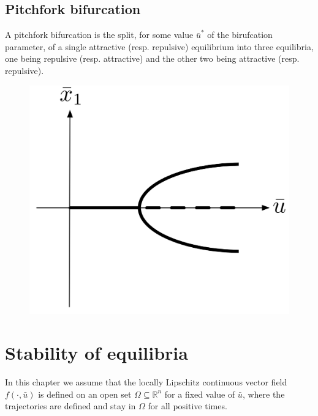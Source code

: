 \documentclass[12pt, openany]{report}
\theoremstyle{definition}
\newcommand{\R}{\mathbb{R}}
\begin{document}
\section{Pitchfork bifurcation}
A pitchfork bifurcation is the split, for some value \(\bar u^*\) of the birufcation parameter, of a single attractive (resp. repulsive) equilibrium into three equilibria, one being repulsive (resp. attractive) and the other two being attractive (resp. repulsive). 
\begin{figure}[H]
    \centering
    \includegraphics[width = .4\textwidth]{img/pitchfork_bif.png}
\end{figure}
\chapter{Stability of equilibria}
In this chapter we assume that the locally Lipschitz continuous vector field \(f(\cdot,\bar u)\) is defined on an open set \(\Omega\subseteq\R^n\) for a fixed value of \(\bar u\), where the trajectories are defined and stay in \(\Omega\) for all positive times. 
\end{document}
